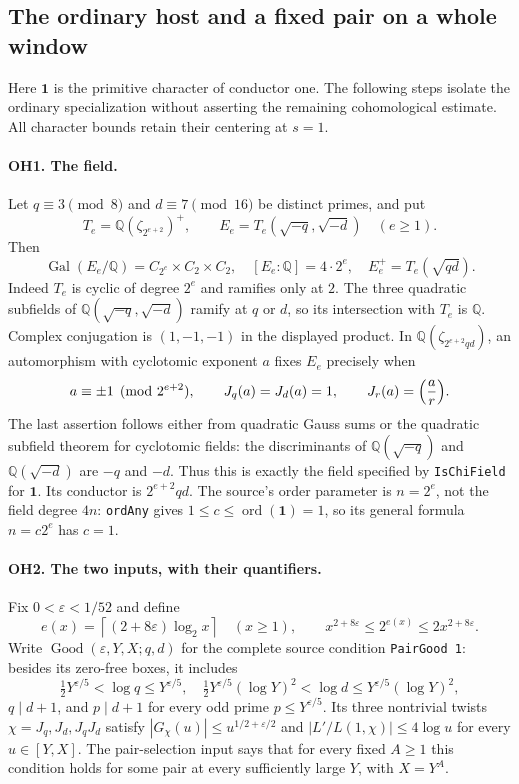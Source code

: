 \subsection{The ordinary host and a fixed pair on a whole window}

Here $\mathbf1$ is the primitive character of conductor one.  The following
steps isolate the ordinary specialization without asserting the remaining
cohomological estimate.  All character bounds retain their centering at $s=1$.

\paragraph{OH1. The field.}
Let $q\equiv3\pmod8$ and $d\equiv7\pmod{16}$ be distinct primes, and put
\[
 T_e=\mathbb Q(\zeta_{2^{e+2}})^+,
 \qquad E_e=T_e(\sqrt{-q},\sqrt{-d})\quad(e\ge1).
\]
Then
\[
 \operatorname{Gal}(E_e/\mathbb Q)=C_{2^e}\times C_2\times C_2,
 \quad [E_e:\mathbb Q]=4\cdot2^e,
 \quad E_e^+=T_e(\sqrt{qd}).
\]
Indeed $T_e$ is cyclic of degree $2^e$ and ramifies only at $2$.
The three quadratic subfields of
$\mathbb Q(\sqrt{-q},\sqrt{-d})$ ramify at $q$ or $d$, so its intersection
with $T_e$ is $\mathbb Q$.  Complex conjugation is $(1,-1,-1)$ in the
displayed product.  In $\mathbb Q(\zeta_{2^{e+2}qd})$, an automorphism with
cyclotomic exponent $a$ fixes $E_e$ precisely when
\[
 a\equiv\pm1\pmod{2^{e+2}},\qquad
 J_q(a)=J_d(a)=1,\qquad J_r(a)=\Bigl(\frac ar\Bigr).
\]
The last assertion follows either from quadratic Gauss sums or the quadratic
subfield theorem for cyclotomic fields: the discriminants of
$\mathbb Q(\sqrt{-q})$ and $\mathbb Q(\sqrt{-d})$ are $-q$ and $-d$.
Thus this is exactly the field specified by \texttt{IsChiField} for
$\mathbf1$.  Its conductor is $2^{e+2}qd$.
The source's order parameter is $n=2^e$, not the field degree $4n$:
\texttt{ordAny} gives $1\le c\le\operatorname{ord}(\mathbf1)=1$, so its
general formula $n=c2^e$ has $c=1$.

\paragraph{OH2. The two inputs, with their quantifiers.}
Fix $0<\varepsilon<1/52$ and define
\[
 e(x)=\left\lceil(2+8\varepsilon)\log_2x\right\rceil\quad(x\ge1),
 \qquad x^{2+8\varepsilon}\le2^{e(x)}\le2x^{2+8\varepsilon}.
\]
Write $\operatorname{Good}(\varepsilon,Y,X;q,d)$ for the complete source
condition \texttt{PairGood 1}: besides its zero-free boxes, it includes
\[
 \tfrac12Y^{\varepsilon/5}<\log q\le Y^{\varepsilon/5},\quad
 \tfrac12Y^{\varepsilon/5}(\log Y)^2<\log d
       \le Y^{\varepsilon/5}(\log Y)^2,
\]
$q\mid d+1$, and $p\mid d+1$ for every odd prime $p\le Y^{\varepsilon/5}$.
Its three nontrivial twists $\chi=J_q,J_d,J_qJ_d$ satisfy
$|G_\chi(u)|\le u^{1/2+\varepsilon/2}$ and
$|L'/L(1,\chi)|\le4\log u$ for every $u\in[Y,X]$.
The pair-selection input says that for every fixed $A\ge1$ this condition
holds for some pair at every sufficiently large $Y$, with $X=Y^A$.


